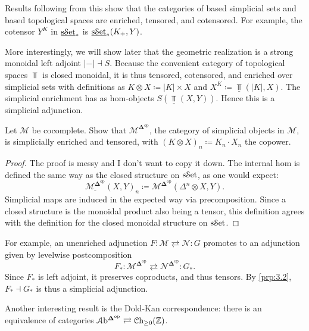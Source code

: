 Results following from this show that the categories of based simplicial sets and based topological spaces are enriched, tensored, and cotensored. For example, the cotensor $Y^K$ in $\underline{\mathrm{s}\mathcal{S}\mathrm{et}} _*$ is $\underline{\mathrm{s}\mathcal{S}\mathrm{et}} _*(K_+,Y)$.

More interestingly, we will show later that the geometric realization is a strong monoidal left adjoint $\left| - \right| \dashv S$. Because the convenient category of topological spaces $\Top $ is closed monoidal, it is thus tensored, cotensored, and enriched over simplicial sets with definitions as $K\otimes X\coloneqq \left| K \right| \times X$ and $X^K\coloneqq \underline{\Top } (\left| K \right| ,X)$. The simplicial enrichment has as hom-objects $S\left( \underline{\Top } (X,Y) \right) $. Hence this is a simplicial adjunction.

\begin{exercise}
	Let $\mathcal{M} $ be cocomplete. Show that $\mathcal{M} ^{\boldsymbol{\Delta} ^{\mathrm{op}} } $, the category of simplicial objects in $\mathcal{M} $, is simplicially enriched and tensored, with $(K\otimes X)_n\coloneqq K_n\cdot X_n$ the copower.
\end{exercise}
\begin{proof}
	The proof is messy and I don't want to copy it down. The internal hom is defined the same way as the closed structure on $\mathrm{s}\mathcal{S}\mathrm{et}$, as one would expect:
	\[
		\underline{\mathcal{M} ^{\boldsymbol{\Delta} ^{\mathrm{op}} } } (X,Y)_n\coloneqq \mathcal{M} ^{\boldsymbol{\Delta} ^{\mathrm{op}} } (\Delta^n \otimes X,Y)
	.\]
	Simplicial maps are induced in the expected way via precomposition. Since a closed structure is the monoidal product also being a tensor, this definition agrees with the definition for the closed monoidal structure on $\mathrm{s}\mathcal{S}\mathrm{et}$.
\end{proof}

For example, an unenriched adjunction $F : \mathcal{M} \rightleftarrows \mathcal{N}  : G$ promotes to an adjunction given by levelwise postcomposition
\[
	F_* : \mathcal{M} ^{\boldsymbol{\Delta} ^{\mathrm{op}} } \rightleftarrows \mathcal{N} ^{\boldsymbol{\Delta} ^{\mathrm{op}} } : G_*
.\]
Since $F_*$ is left adjoint, it preserves coproducts, and thus tensors. By \cref{prp:3.2}, $F_*\dashv G_*$ is thus a simplicial adjunction.

Another interesting result is the Dold-Kan correspondence: there is an equivalence of categories $\mathcal{A}\mathrm{b}^{\boldsymbol{\Delta} ^{\mathrm{op}} } \rightleftarrows \mathcal{C}\mathrm{h}_{\geq 0} (\mathbb{Z} )$.


